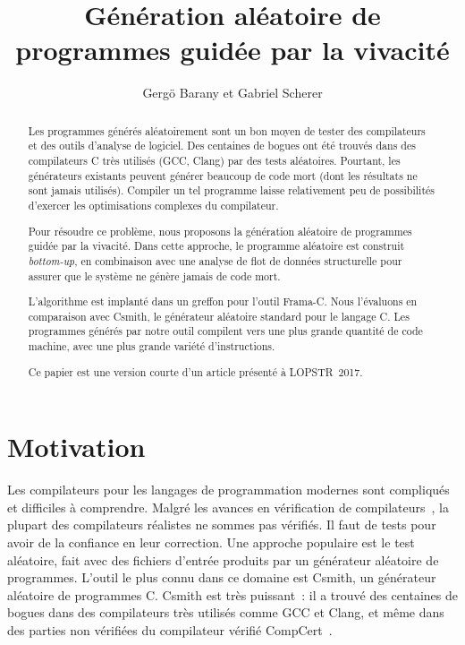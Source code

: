 \documentclass[a4paper]{easychair}
\title{Génération aléatoire de programmes guidée par la vivacité}
\author{Gergö Barany\inst{1} et Gabriel Scherer\inst{2}}
\institute{
Inria Paris \\
\email{gergo.barany@inria.fr}
\and
Inria Saclay \\
\email{gabriel.scherer@gmail.com}
}
\newcommand{\anglais}[1]{\textit{#1}}
\begin{document}
\maketitle
\thispagestyle{plain}

\begin{abstract}
Les programmes générés aléatoirement sont un bon moyen de tester des
compilateurs et des outils d'analyse de logiciel. Des centaines de bogues
ont été trouvés dans des compilateurs C très utilisés (GCC, Clang) par des
tests aléatoires. Pourtant, les générateurs existants peuvent générer
beaucoup de code mort (dont les résultats ne sont jamais utilisés). Compiler
un tel programme laisse relativement peu de possibilités d'exercer les
optimisations complexes du compilateur.

Pour résoudre ce problème, nous proposons la génération aléatoire de
programmes guidée par la vivacité. Dans cette approche, le programme aléatoire
est construit \anglais{bottom-up}, en combinaison avec une analyse de flot de
données structurelle pour assurer que le système ne génère jamais de code
mort.

L'algorithme est implanté dans un greffon pour l'outil Frama-C. Nous
l'évaluons en comparaison avec Csmith, le générateur aléatoire standard pour
le langage C. Les programmes générés par notre outil compilent vers une plus
grande quantité de code machine, avec une plus grande variété
d'instructions.

Ce papier est une version courte d'un article présenté à LOPSTR~2017.
\end{abstract}



\section{Motivation}

Les compilateurs pour les langages de programmation modernes sont
compliqués et difficiles à comprendre. Malgré les avances en vérification de
compilateurs~\cite{leroy-2009,tan-2016}, la plupart des compilateurs
réalistes ne sommes pas vérifiés. Il faut de tests pour avoir de la
confiance en leur correction. Une approche populaire est le test aléatoire,
fait avec des fichiers d'entrée produits par un générateur aléatoire de
programmes. L'outil le plus connu dans ce domaine est Csmith, un générateur
aléatoire de programmes C. Csmith est très puissant~: il a trouvé des
centaines de bogues dans des compilateurs très utilisés comme GCC et Clang,
et même dans des parties non vérifiées du compilateur vérifié
CompCert~\cite{csmith-2011}.
\end{document}
